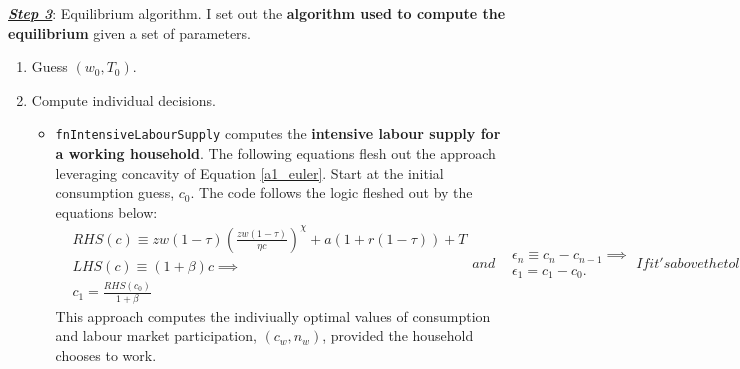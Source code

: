 \colorbox{BurntOrange!25}{\textbf{\textit{\underline{Step 3}}}: Equilibrium algorithm.}
I set out the \textcolor{BurntOrange}{\textbf{algorithm used to compute the equilibrium}} given a set of parameters. 
\begin{enumerate}
    \item Guess $\left(w_0,T_0 \right)$.
    \item Compute individual decisions. 
    \begin{itemize}
        \item \texttt{fnIntensiveLabourSupply} computes the \textcolor{BurntOrange}{\textbf{intensive labour supply for a working household}}. 
        The following equations flesh out the approach leveraging concavity of Equation \eqref{a1_euler}.
        Start at the initial consumption guess, $c_0$. The code follows the logic fleshed out by the equations below:
        \begin{subequations}
            \begin{align}
                & RHS\left(c \right)\equiv z w(1-\tau) \left( \frac{z w(1-\tau)}{\eta c}\right)^\chi +a(1+r(1-\tau))+T \\
                & LHS\left(c \right) \equiv (1+\beta) c \implies \\
                & c_1 = \frac{RHS\left(c_0 \right)}{1+\beta}
            \end{align}
            and 
            \begin{align}
                & \epsilon_n \equiv c_{n} - c_{n-1} \implies \\
                &\epsilon_1 = c_1 - c_0. 
            \end{align}
            If it's above the tolerance level, then repeat until it works:
            \begin{align}
                & c_n = \frac{RHS\left(c_{n-1} \right)}{1+\beta} \implies \\
                & \epsilon_n =c_{n} - c_{n-1}.
            \end{align}
        \end{subequations}
        This approach computes the indiviually optimal values of consumption and labour market participation, $\left(c_w, n_w \right)$, provided the household chooses to work.\vspace{3mm}


\end{itemize}
\end{enumerate}
